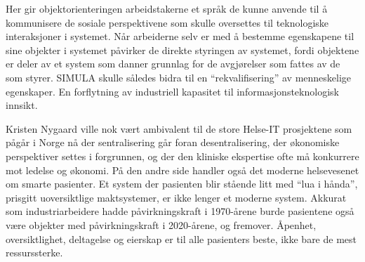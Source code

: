 Her gir objektorienteringen arbeidstakerne et språk de kunne anvende til å kommunisere de sosiale perspektivene som skulle oversettes til teknologiske interaksjoner i systemet. Når arbeiderne selv er med å bestemme egenskapene til sine objekter i systemet påvirker de direkte styringen av systemet, fordi objektene er deler av et system som danner grunnlag for de avgjørelser som fattes av de som styrer. SIMULA skulle således bidra til en ``rekvalifisering'' av menneskelige egenskaper. En forflytning av industriell kapasitet til informasjonsteknologisk innsikt.

Kristen Nygaard ville nok vært ambivalent til de store Helse-IT prosjektene som pågår i Norge nå der sentralisering går foran desentralisering, der økonomiske perspektiver settes i forgrunnen, og der den kliniske ekspertise ofte må konkurrere mot ledelse og økonomi. På den andre side handler også det moderne helsevesenet om smarte pasienter. Et system der pasienten blir stående litt med ``lua i hånda'', prisgitt uoversiktlige maktsystemer, er ikke lenger et moderne system. Akkurat som industriarbeidere hadde påvirkningskraft i 1970-årene burde pasientene også være objekter med påvirkningskraft i 2020-årene, og fremover. Åpenhet, oversiktlighet, deltagelse og eierskap er til alle pasienters beste, ikke bare de mest ressurssterke.
